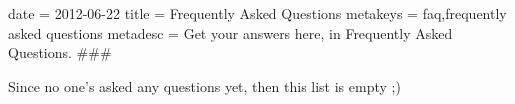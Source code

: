 date = 2012-06-22
title = Frequently Asked Questions
metakeys = faq,frequently asked questions
metadesc = Get your answers here, in Frequently Asked Questions.
###

Since no one's asked any questions yet, then this list is empty ;)

